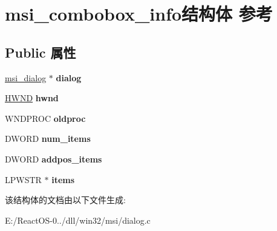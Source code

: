 \hypertarget{structmsi__combobox__info}{}\section{msi\+\_\+combobox\+\_\+info结构体 参考}
\label{structmsi__combobox__info}
\subsection*{Public 属性}
\begin{DoxyCompactItemize}
\item 
\mbox{\label{structmsi__combobox__info_a251d79b764cc7696f7d21d86d1f22a3a}} 
\hyperlink{structmsi__dialog__tag}{msi\+\_\+dialog} $\ast$ {\bfseries dialog}
\item 
\mbox{\label{structmsi__combobox__info_a16ff01cfa3130c540a49da07bd459c8e}} 
\hyperlink{interfacevoid}{H\+W\+ND} {\bfseries hwnd}
\item 
\mbox{\label{structmsi__combobox__info_a5bc3d26b398566fb788bbe09a8528827}} 
W\+N\+D\+P\+R\+OC {\bfseries oldproc}
\item 
\mbox{\label{structmsi__combobox__info_a50afe4e13dcc8b56093c3256f059e0b0}} 
D\+W\+O\+RD {\bfseries num\+\_\+items}
\item 
\mbox{\label{structmsi__combobox__info_a9cf4565c119cbc6a7f38ea5493d3845d}} 
D\+W\+O\+RD {\bfseries addpos\+\_\+items}
\item 
\mbox{\label{structmsi__combobox__info_ac78d6b3bc4791f07be1e4bf058ea3ca4}} 
L\+P\+W\+S\+TR $\ast$ {\bfseries items}
\end{DoxyCompactItemize}


该结构体的文档由以下文件生成\+:\begin{DoxyCompactItemize}
\item 
E\+:/\+React\+O\+S-\/0../dll/win32/msi/dialog.\+c\end{DoxyCompactItemize}
